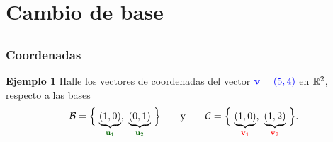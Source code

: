 \section{Cambio de base}

\subsection{}

\begin{frame}\frametitle{Coordenadas}

\begin{ej}{\textbf{Ejemplo 1}}
	Halle los vectores de coordenadas del vector ${\color{blue}\mathbf{v}=(5,4)}$ en $\mathbb{R}^2$, respecto a las bases
	\[
		\mathcal{B} = \Big\{ \, \underbrace{(1,0)}_{\color{darkgreen}\mathbf{u}_1}, \ \underbrace{(0,1)}_{\color{darkgreen}\mathbf{u}_2} \, \Big\}
		\qquad \text{y} \qquad
		\mathcal{C} = \Big\{ \, \underbrace{(1,0)}_{\color{red}\mathbf{v}_1}, \ \underbrace{(1,2)}_{\color{red}\mathbf{v}_2} \, \Big\}.
	\]
\end{ej}


\end{frame}
